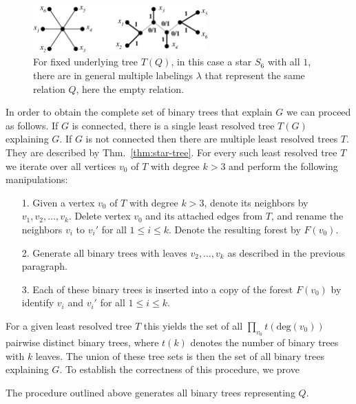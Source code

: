 \documentclass[smallextended]{svjour3}
\begin{document}
\begin{figure}[htbp]
\begin{center}
\includegraphics[width=0.6\textwidth]{non_lrt-new.eps}
\end{center}
\caption{For fixed underlying tree $T(Q)$, in this case a star $S_6$ with
  all $1$, there are in general multiple labelings $\lambda$ that represent
  the same relation $Q$, here the empty relation.}
\label{fig:non_lrt}
\end{figure}

 

  In order to obtain the complete set of binary trees that explain
  $G$ we can proceed as follows. If $G$ is connected, there is a single
  least resolved tree $T(G)$ explaining $G$. If $G$ is not connected then
  there are multiple least resolved trees $T$. They are described by
  Thm.~\ref{thm:star-tree}. For every such least resolved tree $T$ we
  iterate over all vertices $v_0$ of $T$ with degree $k>3$ and perform the
  following manipulations:
  \begin{itemize}
  \item[{1.}] Given a vertex $v_0$ of $T$ with degree $k>3$, denote its
    neighbors by $v_1, v_2,\dots, v_k$. Delete vertex $v_0$ and its attached
    edges from $T$, and rename the neighbors $v_i$ to $v_i'$ for all $1\leq
    i\leq k$. Denote the resulting forest by $F(v_0)$.
  \item[{2.}] Generate all binary trees with leaves $v_2,\dots, v_k$ as
    described in the previous paragraph.
  \item[{3.}] Each of these binary trees is inserted into a copy of the
    forest $F(v_0)$ by identify $v_i$ and $v_i'$ for all $1\leq i\leq k$.
  \end{itemize}
  For a given least resolved tree $T$ this yields the set of all
  $\prod_{v_0} t(\mathrm{deg}(v_0))$ pairwise distinct binary trees, where
  $t(k)$ denotes the number of binary trees with $k$ leaves. The union of
  these tree sets is then the set of all binary trees explaining $G$.  To
  establish the correctness of this procedure, we prove
\newline
\begin{lemma}\label{lem:binary}
  The procedure outlined above generates all binary trees representing $Q$.
\end{lemma}
\end{document}

